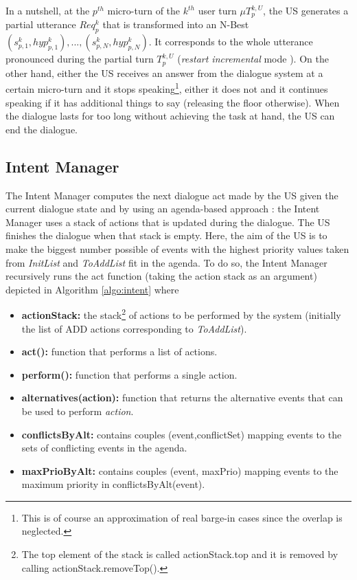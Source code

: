 				In a nutshell, at the $p^{th}$ micro-turn of the $k^{th}$ user turn $\mu T^{k,U}_p$, the US generates a partial utterance $Req^k_p$ that is transformed into an N-Best ${(s^k_{p,1}, hyp^k_{p,1}),...,(s^k_{p,N}, hyp^k_{p,N})}$. It corresponds to the whole utterance pronounced during the partial turn $T^{k,U}_p$ (\textit{restart incremental} mode \cite{Schlangen2011}). On the other hand, either the US receives an answer from the dialogue system at a certain micro-turn and it stops speaking\footnote{This is of course an approximation of real barge-in cases since the overlap is neglected.}, either it does not and it continues speaking if it has additional things to say (releasing the floor otherwise). When the dialogue lasts for too long without achieving the task at hand, the US can end the dialogue.
    
    \subsection{Intent Manager}
    \label{subsec:intentmanager}

        The Intent Manager computes the next dialogue act made by the US given the current dialogue state and by using an agenda-based approach \cite{Wei1999,Schatzmann2007}: the Intent Manager uses a stack of actions that is updated during the dialogue. The US finishes the dialogue when that stack is empty. Here, the aim of the US is to make the biggest number possible of events with the highest priority values taken from \textit{InitList} and \textit{ToAddList} fit in the agenda. To do so, the Intent Manager recursively runs the act function (taking the action stack as an argument) depicted in Algorithm \ref{algo:intent} where
        
        
        \begin{itemize}
          \item \textbf{actionStack:} the stack\footnote{The top element of the stack is called actionStack.top and it is removed by calling actionStack.removeTop().} of actions to be performed by the system (initially the list of ADD actions corresponding to \textit{ToAddList}).
          \item \textbf{act():} function that performs a list of actions.
          \item \textbf{perform():} function that performs a single action.
          \item \textbf{alternatives(action):} function that returns the alternative events that can be used to perform \textit{action}.
          \item \textbf{conflictsByAlt:} contains couples (event,conflictSet) mapping events to the sets of conflicting events in the agenda.
          \item \textbf{maxPrioByAlt:} contains couples (event, maxPrio) mapping events to the maximum priority in conflictsByAlt(event).
        \end{itemize}
			
